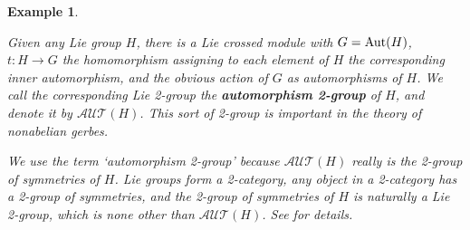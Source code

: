 \documentclass{article}
\newcommand{\maps}{\colon}
\newcommand{\Aut}{{\rm Aut}}
\newcommand{\AUT}{\mathcal{AUT}}
\newtheorem{example}[theorem]{Example}
\newcommand{\et}{\hspace{-0.08in}{\bf .}\hspace{0.1in}}
\begin{document}
\begin{example} \et
\label{crossed.2} 
{\rm
Given any Lie group $H$, there is a Lie
crossed module with $G = \Aut(H)$, $t \maps H \to G$ the homomorphism
assigning to each element of $H$ the corresponding inner automorphism,
and the obvious action of $G$ as automorphisms of $H$.  We call the
corresponding Lie 2-group the {\bf automorphism 2-group} of $H$, and
denote it by $\AUT(H)$.   This sort of 2-group is important in the theory 
of \emph{nonabelian} gerbes.  

We use the term `automorphism 2-group' because $\AUT(H)$ really is the
2-group of symmetries of $H$.  Lie groups form a 2-category, any object
in a 2-category has a 2-group of symmetries, and the 2-group of 
symmetries of $H$ is naturally a Lie 2-group, which is none other than
$\AUT(H)$.  See \cite{BaezLauda:2003} for details.
}\end{example}
\end{document}
